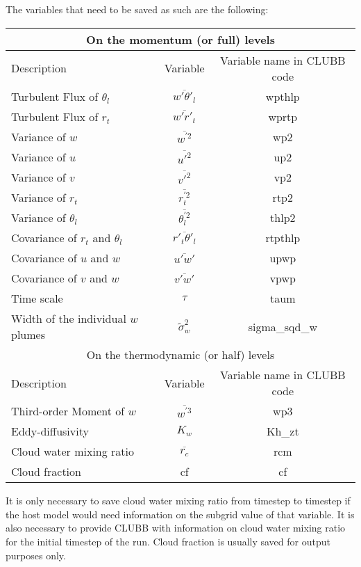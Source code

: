 \documentclass[11pt,fleqn]{article}
\begin{document}
The variables that need to be saved as such are the following:
\begin{center}
\begin{tabular} {|l|c|c|}
\hline
\multicolumn{3}{|c|}{On the momentum (or full) levels}\\\hline
Description&Variable&Variable name in CLUBB code\\\hline
Turbulent Flux of $\theta_l$&$\overline{w'\theta'_l}$&wpthlp\\\hline
Turbulent Flux of $r_t$&$\overline{w'r'_t}$&wprtp\\\hline
Variance of $w$&$\overline{w^{'2}}$&wp2\\\hline
Variance of $u$&$\overline{u'^2}$&up2\\\hline
Variance of $v$&$\overline{v'^2}$&vp2\\\hline
Variance of $r_t$&$\overline{r^{'2}_t}$&rtp2\\\hline
Variance of $\theta_l$&$\overline{\theta^{'2}_l}$&thlp2\\\hline
Covariance of $r_t$ and $\theta_l$&$\overline{r'_t\theta'_l}$&rtpthlp\\\hline
Covariance of $u$ and $w$&$\overline{u'w'}$&upwp\\\hline
Covariance of $v$ and $w$&$\overline{v'w'}$&vpwp\\\hline
Time scale&$\tau$&taum\\\hline
Width of the individual $w$ plumes&$\tilde{\sigma}^2_w$&sigma\_sqd\_w\\\hline
\multicolumn{3}{|c|}{On the thermodynamic (or half) levels}\\\hline
Description&Variable&Variable name in CLUBB code\\\hline
Third-order Moment of $w$&$\overline{w^{'3}}$&wp3\\\hline
Eddy-diffusivity &$K_{w}$&Kh\_zt\\\hline
Cloud water mixing ratio&$\overline{r_c}$&rcm\\\hline
Cloud fraction&cf&cf\\\hline
\end{tabular}
\end{center}
It is only necessary to save cloud water mixing ratio from timestep to timestep
if the host model would need information on the subgrid value of that variable.
It is also necessary to provide CLUBB with information on cloud water mixing
ratio for the initial timestep of the run.  Cloud fraction is usually saved for
output purposes only.

%

\clearpage

\end{document}

